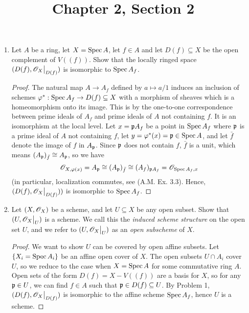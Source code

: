 \documentclass{article}
\title{Chapter 2, Section 2}
\begin{document}
\maketitle
\begin{enumerate} [label=\textbf{\arabic*.}, leftmargin=0em]

\item Let $A$ be a ring, let $X = \operatorname{Spec}{A}$, let $f \in A$ and let $D(f) \subseteq X$ be the open complement of $V((f))$. Show that the locally ringed space $(D(f), \restr{\fO_X}{D(f)})$ is isomorphic to $\operatorname{Spec}{A_f}$.

\begin{proof}
    The natural map $A \to A_f$ defined by $a \mapsto a / 1$ induces an inclusion of schemes $\varphi ^* : \operatorname{Spec}{A_f} \to D(f) \subseteq X$ with a morphism of sheaves which is a homeomorphism onto its image. This is by the one-to-one correspondence between prime ideals of $A_f$ and prime ideals of $A$ not containing $f$. It is an isomorphism at the local level. Let $x = \mathfrak{p}A_f$ be a point in $\operatorname{Spec}{A_f}$ where $\mathfrak{p}$ is a prime ideal of $A$ not containing $f$, let $y = \varphi^*(x) = \mathfrak{p} \in \operatorname{Spec}{A}$, and let $\bar{f}$ denote the image of $f$ in $A_{\mathfrak{p}}$. Since $\mathfrak{p}$ does not contain $f$, $\bar{f}$ is a unit, which means $(A_{\mathfrak{p}})_{\bar{f}} \cong A_{\mathfrak{p}}$, so we have
    \begin{equation*}
        \mathscr{O}_{X, \varphi(x)} = A_{\mathfrak{p}} \cong (A_{\mathfrak{p}})_{\bar{f}} \cong (A_f)_{\mathfrak{p}A_f} = \mathscr{O}_{\operatorname{Spec}{A_f}, x}
    \end{equation*}
    (in particular, localization commutes, see (A.M. Ex. 3.3). Hence, $(D(f), \restr{\fO_X}{D(f)}))$ is isomorphic to $\operatorname{Spec}{A_f}$.
\end{proof}

\item Let $(X, \mathscr{O}_X)$ be a scheme, and let $U \subseteq X$ be any open subset. Show that $(U, \restr{\fO_X}{U})$ is a scheme. We call this the \textit{induced scheme structure} on the open set $U$, and we refer to $(U, \restr{\fO_X}{U})$ as an \textit{open subscheme} of $X$.

\begin{proof}
    We want to show $U$ can be covered by open affine subsets. Let $\{ X_i = \operatorname{Spec}{A_i} \}$ be an affine open cover of $X$. The open subsets $U \cap A_i$ cover $U$, so we reduce to the case when $X = \operatorname{Spec}{A}$ for some commutative ring $A$. Open sets of the form $D(f) = X - V((f))$ are a basis for $X$, so for any $\mathfrak{p} \in U$, we can find $f \in A$ such that $\mathfrak{p} \in D(f) \subseteq U$. By Problem 1, $(D(f), \restr{\fO_X}{D(f)})$ is isomorphic to the affine scheme $\operatorname{Spec}{A_f}$, hence $U$ is a scheme.
\end{proof}


\end{enumerate}
\end{document}
